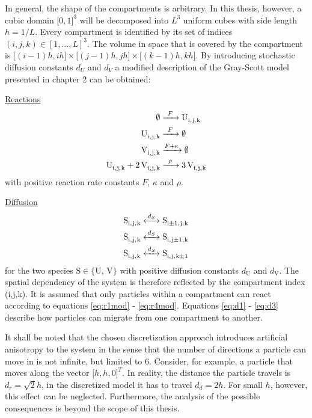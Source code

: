 In general, the shape of the compartments is arbitrary. In this thesis, however, a cubic domain $\lbrack0,1\rbrack^3$ will be decomposed into $L^3$ uniform cubes with side length $h = 1 / L$. Every compartment is identified by its set of indices $(i,j,k) \in [1,\ldots,L]^3$. The volume in space that is covered by the compartment is $\lbrack (i-1)h,ih\rbrack \times \lbrack (j-1)h,jh \rbrack \times \lbrack (k-1)h,kh \rbrack$. 
By introducing stochastic diffusion constants $d_U$ and $d_V$ a modified description of the Gray-Scott model presented in chapter 2 can be obtained:

\underline{Reactions}
\begin{align}
\label{eq:r1mod}
\cee{\emptyset{} &->[F] U_{i,j,k}} \\
\label{eq:r2mod}
\cee{U_{i,j,k} &->[F] \emptyset} \\
\label{eq:r3mod}
\cee{V_{i,j,k} &->[F+\kappa] \emptyset} \\
\label{eq:r4mod}
\cee{U_{i,j,k} + 2V_{i,j,k} &->[\rho] 3V_{i,j,k}}
\end{align}
with positive reaction rate constants $F$, $\kappa$ and $\rho$.

\underline{Diffusion}
\begin{align}
\label{eq:d1}
\cee{S_{i,j,k} &<->[d_S] S_{i\pm{}1,j,k}} \\
\cee{S_{i,j,k} &<->[d_S] S_{i,j\pm{}1,k}} \\
\cee{S_{i,j,k} &<->[d_S] S_{i,j,k\pm{}1}}
\label{eq:d3}
\end{align}
for the two species $\text{S} \in \{\text{U, V}\}$ with positive diffusion constants $d_\text{U}$ and $d_\text{V}$. The spatial dependency of the system is therefore reflected by the compartment index (i,j,k). It is assumed that only particles within a compartment can  react according to equations \eqref{eq:r1mod} - \eqref{eq:r4mod}. Equations \eqref{eq:d1} - \eqref{eq:d3} describe how particles can migrate from one compartment to another. 

It shall be noted that the chosen discretization approach introduces artificial anisotropy to the system in the sense that the number of directions a particle can move in is not infinite, but limited to 6. Consider, for example, a particle that moves along the vector $\lbrack h,h,0 \rbrack^T$. In reality, the distance the particle travels is $d_r = \sqrt{2}h$, in the discretized model it has to travel $d_d = 2h$. For small $h$, however, this effect can be neglected. Furthermore, the analysis of the possible consequences is beyond the scope of this thesis. 

